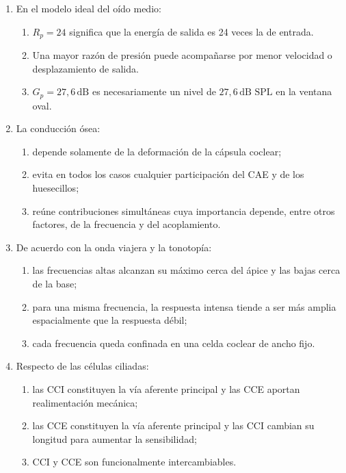 \begin{enumerate}[label=\textbf{D\arabic*.},leftmargin=*]
    \item En el modelo ideal del oído medio:
    \begin{enumerate}[label=\alph*)]
        \item \(R_p=24\) significa que la energía de salida es 24 veces la de
        entrada.
        \item Una mayor razón de presión puede acompañarse por menor velocidad
        o desplazamiento de salida.
        \item \(G_p=27{,}6\,\text{dB}\) es necesariamente un nivel de
        \(27{,}6\,\text{dB SPL}\) en la ventana oval.
    \end{enumerate}

    \item La conducción ósea:
    \begin{enumerate}[label=\alph*)]
        \item depende solamente de la deformación de la cápsula coclear;
        \item evita en todos los casos cualquier participación del CAE y de
        los huesecillos;
        \item reúne contribuciones simultáneas cuya importancia depende, entre
        otros factores, de la frecuencia y del acoplamiento.
    \end{enumerate}

    \item De acuerdo con la onda viajera y la tonotopía:
    \begin{enumerate}[label=\alph*)]
        \item las frecuencias altas alcanzan su máximo cerca del ápice y las
        bajas cerca de la base;
        \item para una misma frecuencia, la respuesta intensa tiende a ser más
        amplia espacialmente que la respuesta débil;
        \item cada frecuencia queda confinada en una celda coclear de ancho
        fijo.
    \end{enumerate}

    \item Respecto de las células ciliadas:
    \begin{enumerate}[label=\alph*)]
        \item las CCI constituyen la vía aferente principal y las CCE aportan
        realimentación mecánica;
        \item las CCE constituyen la vía aferente principal y las CCI cambian
        su longitud para aumentar la sensibilidad;
        \item CCI y CCE son funcionalmente intercambiables.
    \end{enumerate}


\end{enumerate}
